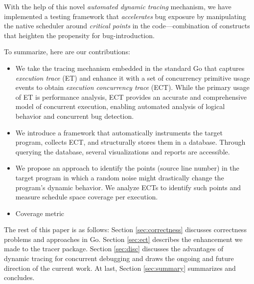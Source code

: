 With the help of this novel \textit{automated dynamic tracing} mechanism,
we have implemented a testing framework that
\textit{accelerates} bug exposure by manipulating the native scheduler around \textit{critical points} in the code---combination of constructs that heighten the propensity for bug-introduction.
%



To summarize, here are our contributions:
\begin{itemize}
    \item We take the tracing mechanism embedded in the standard Go that captures \textit{execution trace} (ET) and enhance it with a set of concurrency primitive usage events to obtain \textit{execution concurrency trace} (ECT). While the primary usage of ET is performance analysis, ECT provides an accurate and comprehensive model of concurrent execution, enabling automated analysis of logical behavior and concurrent bug detection.
    \item We introduce a framework that automatically instruments the target program, collects ECT, and structurally stores them in a database. Through querying the database, several visualizations and reports are accessible.
    \item We propose an approach to identify the points (\ie source line number) in the target program in which a random noise might drastically change the program's dynamic behavior. We analyze ECTs to identify such points and measure schedule space coverage per execution.
    \item Coverage metric
\end{itemize}
The rest of this paper is as follows: Section \ref{sec:correctness} discusses correctness problems and approaches in Go. Section \ref{sec:ect} describes the enhancement we made to the tracer package. Section \ref{sec:disc} discusses the advantages of dynamic tracing for concurrent debugging and draws the ongoing and future direction of the current work. At last, Section \ref{sec:summary} summarizes and concludes.
